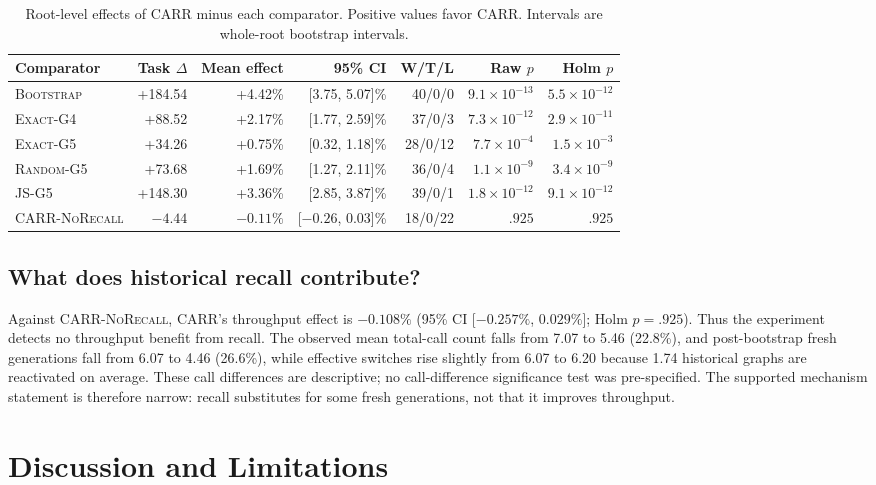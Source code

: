 \documentclass[sigconf,review,anonymous]{acmart}
\newcommand{\carr}{\textsc{CARR}\xspace}
\newcommand{\norecall}{\textsc{CARR-NoRecall}\xspace}
\newcommand{\bbootstrap}{\textsc{Bootstrap}\xspace}
\newcommand{\exactfour}{\textsc{Exact-G4}\xspace}
\newcommand{\exactfive}{\textsc{Exact-G5}\xspace}
\newcommand{\randomfive}{\textsc{Random-G5}\xspace}
\newcommand{\jsfive}{\textsc{JS-G5}\xspace}
\begin{document}
\begin{table}[t]
\caption{Root-level effects of \carr minus each comparator. Positive values
favor \carr. Intervals are whole-root bootstrap intervals.}
\label{tab:contrasts}
\centering
\small
\begin{tabular}{lrrrrrr}
\toprule
Comparator & Task $\Delta$ & Mean effect & 95\% CI & W/T/L & Raw $p$ & Holm $p$ \\
\midrule
\bbootstrap & +184.54 & +4.42\% & [3.75, 5.07]\% & 40/0/0 & $9.1{\times}10^{-13}$ & $5.5{\times}10^{-12}$ \\
\exactfour & +88.52 & +2.17\% & [1.77, 2.59]\% & 37/0/3 & $7.3{\times}10^{-12}$ & $2.9{\times}10^{-11}$ \\
\exactfive & +34.26 & +0.75\% & [0.32, 1.18]\% & 28/0/12 & $7.7{\times}10^{-4}$ & $1.5{\times}10^{-3}$ \\
\randomfive & +73.68 & +1.69\% & [1.27, 2.11]\% & 36/0/4 & $1.1{\times}10^{-9}$ & $3.4{\times}10^{-9}$ \\
\jsfive & +148.30 & +3.36\% & [2.85, 3.87]\% & 39/0/1 & $1.8{\times}10^{-12}$ & $9.1{\times}10^{-12}$ \\
\norecall & $-4.44$ & $-0.11\%$ & [$-0.26$, 0.03]\% & 18/0/22 & $.925$ & $.925$ \\
\bottomrule
\end{tabular}
\end{table}

\subsection{What does historical recall contribute?}

Against \norecall, \carr's throughput effect is $-0.108\%$ (95\% CI
[$-0.257\%$, $0.029\%$]; Holm $p=.925$). Thus the experiment detects no
throughput benefit from recall. The observed mean total-call count falls from
7.07 to 5.46 (22.8\%), and post-bootstrap fresh generations fall from 6.07 to
4.46 (26.6\%), while effective switches rise slightly from 6.07 to 6.20 because
1.74 historical graphs are reactivated on average. These call differences are
descriptive; no call-difference significance test was pre-specified. The
supported mechanism statement is therefore narrow: recall substitutes for some
fresh generations, not that it improves throughput.

\section{Discussion and Limitations}
\end{document}
